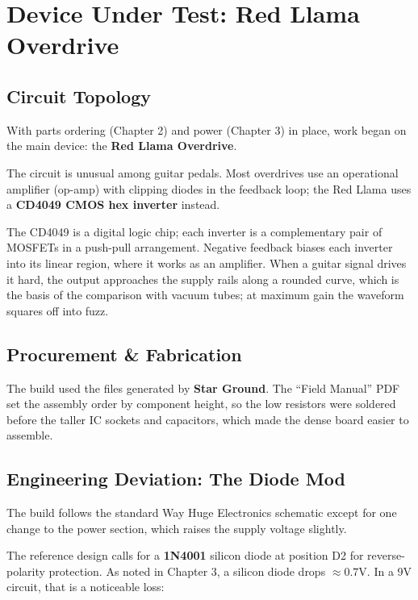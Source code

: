\documentclass[11pt, a4paper]{report}
\begin{document}
\chapter{Device Under Test: Red Llama Overdrive}

\section{Circuit Topology}
With parts ordering (Chapter 2) and power (Chapter 3) in place, work began on the main device: the \textbf{Red Llama Overdrive}.

The circuit is unusual among guitar pedals. Most overdrives use an operational amplifier (op-amp) with clipping diodes in the feedback loop; the Red Llama uses a \textbf{CD4049 CMOS hex inverter} instead.\cite{ti_cd4049ub_datasheet}

The CD4049 is a digital logic chip; each inverter is a complementary pair of MOSFETs in a push-pull arrangement.\cite{ti_cd4049ub_datasheet} Negative feedback biases each inverter into its linear region, where it works as an amplifier. When a guitar signal drives it hard, the output approaches the supply rails along a rounded curve, which is the basis of the comparison with vacuum tubes; at maximum gain the waveform squares off into fuzz.

\section{Procurement \& Fabrication}
The build used the files generated by \textbf{Star Ground}. The ``Field Manual'' PDF set the assembly order by component height, so the low resistors were soldered before the taller IC sockets and capacitors, which made the dense board easier to assemble.

\section{Engineering Deviation: The Diode Mod}
The build follows the standard Way Huge Electronics schematic except for one change to the power section, which raises the supply voltage slightly.

The reference design calls for a \textbf{1N4001} silicon diode at position D2 for reverse-polarity protection.\cite{tayda_redllama_schematic} As noted in Chapter 3, a silicon diode drops $\approx 0.7\text{V}$.\cite{diode_1n4001_datasheet} In a 9V circuit, that is a noticeable loss:
\end{document}
